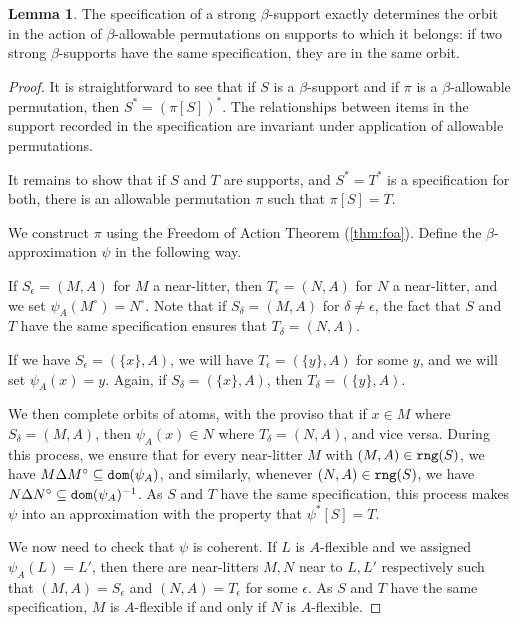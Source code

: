 \documentclass{article}
\theoremstyle{definition}
\newtheorem{lemma}[theorem]{Lemma}
\theoremstyle{remark}
\begin{document}
\begin{lemma}\label{lem:specification_determines_orbit}
The specification of a strong $\beta$-support exactly determines the orbit in the action of $\beta$-allowable permutations on supports to which it belongs:  if two strong $\beta$-supports have the same specification, they are in the same orbit.
\end{lemma}
\begin{proof}
It is straightforward to see that if $S$ is a $\beta$-support and if $\pi$ is a $\beta$-allowable permutation, then $S^* = (\pi[S])^*$.  The relationships between items in the support recorded in the specification are invariant under application of allowable permutations.

It remains to show that if $S$ and $T$ are supports, and $S^*=T^*$ is a specification for both, there is an allowable permutation $\pi$ such that $\pi[S]=T$.

We construct $\pi$ using the Freedom of Action Theorem {(\ref{thm:foa})}.
Define the $\beta$-approximation $\psi$ in the following way.

If $S_\epsilon = (M,A)$ for $M$ a near-litter, then $T_\epsilon = (N,A)$ for $N$ a near-litter, and we set $\psi_A(M^\circ) = N^\circ$.
Note that if $S_\delta = (M,A)$ for $\delta \neq \epsilon$, the fact that $S$ and
$T$ have the same specification ensures that $T_\delta = (N,A)$.

If we have $S_\epsilon = (\{x\},A)$, we will have $T_\epsilon = (\{y\},A)$ for some $y$, and we will set $\psi_A(x) = y$.
Again, if $S_\delta = (\{x\},A)$, then $T_\delta = (\{y\},A)$.

We then complete orbits of atoms, with the proviso that if $x \in M$ where $S_\delta = (M, A)$, then $\psi_A(x) \in N$ where $T_\delta = (N, A)$, and vice versa.
During this process, we ensure that for every near-litter $M$ with $(M,A) \in {\tt rng}(S)$, we have $M \Delta M^\circ \subseteq {\tt dom}(\psi_A)$, and similarly, whenever $(N,A) \in {\tt rng}(S)$, we have $N \Delta N^\circ \subseteq {\tt dom}(\psi_A)^{-1}$.
As $S$ and $T$ have the same specification, this process makes $\psi$ into an approximation with the property that $\psi^*[S] = T$.

We now need to check that $\psi$ is coherent.
If $L$ is $A$-flexible and we assigned $\psi_A(L) = L'$, then there are near-litters $M, N$ near to $L, L'$ respectively such that $(M,A) = S_\epsilon$ and $(N,A) = T_\epsilon$ for some $\epsilon$.
As $S$ and $T$ have the same specification, $M$ is $A$-flexible if and only if $N$ is $A$-flexible.


\end{proof}
\end{document}
